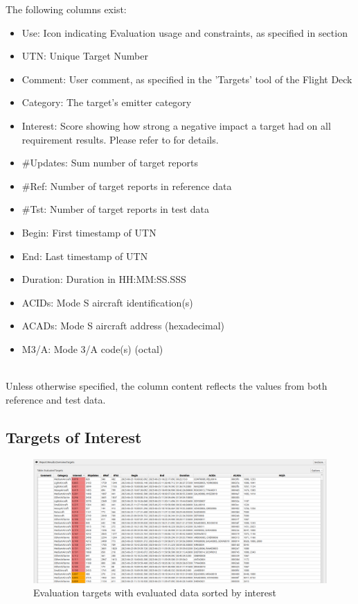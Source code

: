 The following columns exist:

\begin{itemize}  
  \item Use: Icon indicating Evaluation usage and constraints, as specified in section 
  \item UTN: Unique Target Number
  \item Comment: User comment, as specified in the 'Targets' tool of the Flight Deck
  \item Category: The target's emitter category
  \item Interest: Score showing how strong a negative impact a target had on all requirement results. Please refer to  for details.
  \item \#Updates: Sum number of target reports
  \item \#Ref: Number of target reports in reference data
  \item \#Tst: Number of target reports in test data
  \item Begin: First timestamp of UTN
  \item End: Last timestamp of UTN
  \item Duration: Duration in HH:MM:SS.SSS
  \item ACIDs: Mode S aircraft identification(s)
  \item ACADs: Mode S aircraft address (hexadecimal)
  \item M3/A: Mode 3/A code(s) (octal)
\end{itemize}
\ \\

Unless otherwise specified, the column content reflects the values from both reference and test data. \\

\subsection{Targets of Interest}
\label{sec:eval_targets_of_interest}

\begin{figure}[H]
  \hspace*{-2cm}
    \includegraphics[width=18cm,frame]{figures/eval_targets_interest.png}
  \caption{Evaluation targets with evaluated data sorted by interest}
\end{figure}

